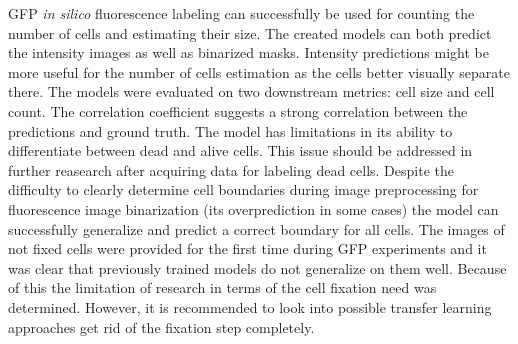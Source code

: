 GFP \textit{in silico} fluorescence labeling can successfully be used for counting the number of cells and estimating their size. The created models can both predict the intensity images as well as binarized masks. Intensity predictions might be more useful for the number of cells estimation as the cells better visually separate there. The models were evaluated on two downstream metrics: cell size and cell count. The correlation coefficient suggests a strong correlation between the predictions and ground truth. The model has limitations in its ability to differentiate between dead and alive cells. This issue should be addressed in further reasearch after acquiring data for labeling dead cells. Despite the difficulty to clearly determine cell boundaries during image preprocessing for fluorescence image binarization (its overprediction in some cases) the model can successfully generalize and predict a correct boundary for all cells. The images of not fixed cells were provided for the first time during GFP experiments and it was clear that previously trained models do not generalize on them well.  Because of this the limitation of research in terms of the cell fixation need was determined. However, it is recommended to look into possible transfer learning approaches get rid of the fixation step completely.
  